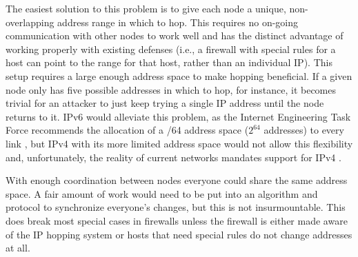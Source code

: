 
\par The easiest solution to this problem is to give each node a unique, non-overlapping address range in which to hop. This requires no on-going communication with other nodes to work well and has the distinct advantage of working properly with existing defenses (i.e., a firewall with special rules for a host can point to the range for that host, rather than an individual IP). This setup requires a large enough address space to make hopping beneficial. If a given node only has five possible addresses in which to hop, for instance, it becomes trivial for an attacker to just keep trying a single \ac{IP} address until the node returns to it. \ac{IPv6} would alleviate this problem, as the Internet Engineering Task Force recommends the allocation of a /64 address space ($2^{64}$ addresses) to every link \cite{rfc3267}, but \ac{IPv4} with its more limited address space would not allow this flexibility and, unfortunately, the reality of current networks mandates support for \ac{IPv4} \cite{EvaluatingIPv6}. 

\par With enough coordination between nodes everyone could share the same address space. A fair amount of work would need to be put into an algorithm and protocol to synchronize everyone's changes, but this is not insurmountable. This does break most special cases in firewalls unless the firewall is either made aware of the \ac{IP} hopping system or hosts that need special rules do not change addresses at all.

